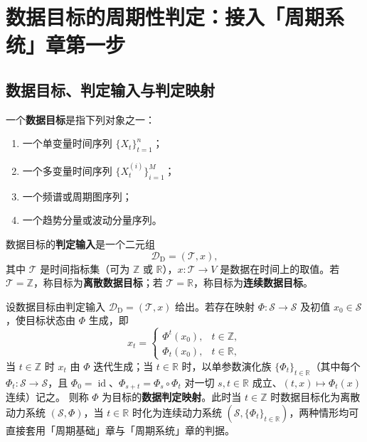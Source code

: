 \section{数据目标的周期性判定：接入「周期系统」章第一步}
\label{sec:data_periodicity_decision}

\subsection{数据目标、判定输入与判定映射}

\begin{definition}[数据目标与判定输入]\label{def:data_target}
一个\textbf{数据目标}是指下列对象之一：
\begin{enumerate}[label=(\roman*)]
    \item 一个单变量时间序列 $\{X_t\}_{t=1}^{n}$；
    \item 一个多变量时间序列 $\{X_t^{(i)}\}_{i=1}^{M}$；
    \item 一个频谱或周期图序列；
    \item 一个趋势分量或波动分量序列。
\end{enumerate}
数据目标的\textbf{判定输入}是一个二元组
\[
\mathcal D_{\mathrm{D}}=(\mathcal T,x),
\]
其中 $\mathcal T$ 是时间指标集（可为 $\mathbb Z$ 或 $\mathbb R$），$x:\mathcal T\to V$ 是数据在时间上的取值。若 $\mathcal T=\mathbb Z$，称目标为\textbf{离散数据目标}；若 $\mathcal T=\mathbb R$，称目标为\textbf{连续数据目标}。
\end{definition}

\begin{definition}[数据判定映射]\label{def:data_periodization}
设数据目标由判定输入 $\mathcal D_{\mathrm{D}}=(\mathcal T,x)$ 给出。若存在映射 $\Phi:\mathcal S\to\mathcal S$ 及初值 $x_0\in\mathcal S$，使目标状态由 $\Phi$ 生成，即
\[
x_t=\begin{cases}\Phi^t(x_0), & t\in\mathbb Z,\\ \Phi_t(x_0), & t\in\mathbb R,\end{cases}
\]
当 $t\in\mathbb Z$ 时 $x_t$ 由 $\Phi$ 迭代生成；当 $t\in\mathbb R$ 时，以单参数演化族 $\{\Phi_t\}_{t\in\mathbb R}$（其中每个 $\Phi_t:\mathcal S\to\mathcal S$，且 $\Phi_0=\operatorname{id}$、$\Phi_{s+t}=\Phi_s\circ\Phi_t$ 对一切 $s,t\in\mathbb R$ 成立、$(t,x)\mapsto\Phi_t(x)$ 连续）记之。
则称 $\Phi$ 为目标的\textbf{数据判定映射}。此时当 $t\in\mathbb Z$ 时数据目标化为离散动力系统 $(\mathcal S,\Phi)$，当 $t\in\mathbb R$ 时化为连续动力系统 $(\mathcal S,\{\Phi_t\}_{t\in\mathbb R})$，两种情形均可直接套用「周期基础」章与「周期系统」章的判据。
\end{definition}

